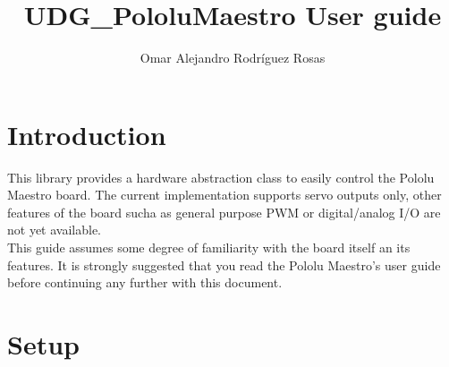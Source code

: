 \documentclass[letterpaper]{book}
\title{UDG\_PololuMaestro User guide}
\author{Omar Alejandro Rodr\'{i}guez Rosas}
\begin{document}
\maketitle

\tableofcontents
\chapter{Introduction}
This library provides a hardware abstraction class to easily control the Pololu Maestro board. The current implementation supports servo outputs only, other features of the board sucha as general purpose PWM or digital/analog I/O are not yet available.\\
This guide assumes some degree of familiarity with the board itself an its features. It is strongly suggested that you read the Pololu Maestro's user guide before continuing any further with this document.\\

\chapter{Setup}
\end{document}
